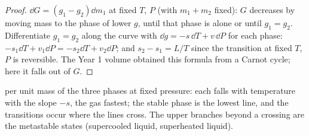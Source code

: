 \begin{proof}
$\dd G = (g_1 - g_2)\dd m_1$ at fixed $T$, $P$ (with $m_1 + m_2$ fixed):
$G$ decreases by moving mass to the phase of lower $g$, until that
phase is alone or until $g_1 = g_2$. Differentiate $g_1 = g_2$ along the
curve with $\dd g = -s\,\dd T + v\,\dd P$ for each phase: $-s_1\dd T +
v_1\dd P = -s_2\dd T + v_2\dd P$; and $s_2 - s_1 = L/T$ since the transition
at fixed $T$, $P$ is reversible. The Year 1 volume obtained this formula
from a Carnot cycle; here it falls out of $G$.
\end{proof}

\begin{omfigure}

{\small {} per unit mass of the three phases at fixed
pressure: each falls with temperature with the slope $-s$, the gas
fastest; the stable phase is the lowest line, and the transitions occur
where the lines cross. The upper branches beyond a crossing are the
metastable states (supercooled liquid, superheated liquid).}
\end{omfigure}

